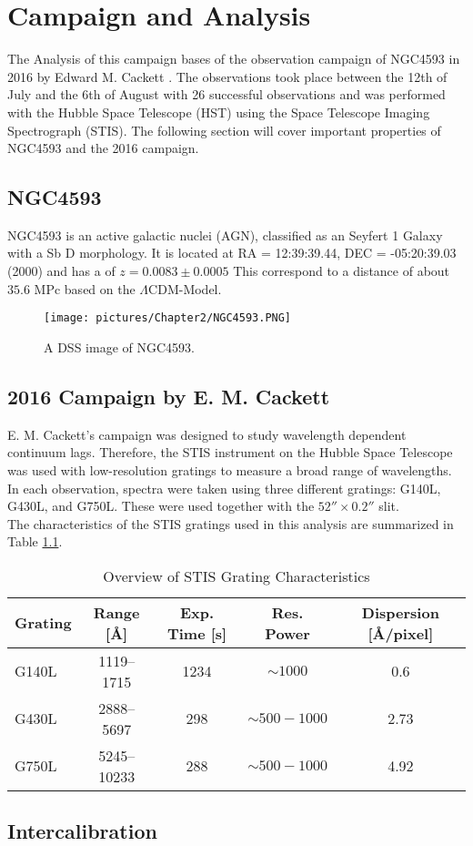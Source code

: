 \chapter{Campaign and Analysis}
\label{campaign_and_analysis}
The Analysis of this campaign bases of the observation campaign of NGC4593 in 2016 by Edward M. Cackett \parencite{cackett2018accretion}. The observations took place between the 12th of July and the 6th of August with 26 successful observations and was performed with the Hubble Space Telescope (HST) using the Space Telescope Imaging Spectrograph (STIS). The following section will cover important properties of NGC4593 and the 2016 campaign.

\section{NGC4593}
\label{NGC4593}

NGC4593 is an active galactic nuclei (AGN), classified as an Seyfert 1 Galaxy with a Sb D morphology.  It is located at RA = 12:39:39.44, DEC = -05:20:39.03 (2000) and has a of $ z = 0.0083 \pm 0.0005$ This correspond to a distance of about $35.6$ MPc \parencite{simbaNGC4593}based on the $\Lambda$CDM-Model. 

\begin{figure}[!ht]
	\centering
	\texttt{[image: pictures/Chapter2/NGC4593.PNG]}
	\caption{A DSS image of NGC4593.}
	\label{fig:NGC4593}
\end{figure}

\section{2016 Campaign by E. M. Cackett}
\label{Campaign_Cackett}

E. M. Cackett's campaign was designed to study wavelength dependent continuum lags. Therefore, the STIS instrument on the Hubble Space Telescope was used with low-resolution gratings to measure a broad range of wavelengths. In each observation, spectra were taken using three different gratings: G140L, G430L, and G750L. These were used together with the $52'' \times 0.2''$ slit.\\
The characteristics of the STIS gratings used in this analysis are summarized in Table \ref{tab:stis_gratings}.

\begin{table}[h!]
	\centering
	\small
	\caption{Overview of STIS Grating Characteristics \parencite{stisgratings}}
	\label{tab:stis_gratings}
	\begin{tabular}{lcccc}
		\hline
		\textbf{Grating} & \textbf{Range [\AA]} & \textbf{Exp. Time [s]} & \textbf{Res. Power} & \textbf{Dispersion [\AA/pixel]} \\
		\hline
		G140L  & 1119--1715  & 1234 & $\sim 1000$         & 0.6 \\
		G430L  & 2888--5697  & 298  & $\sim 500 - 1000$    & 2.73 \\
		G750L  & 5245--10233 & 288  & $\sim 500 - 1000$    & 4.92 \\
		\hline
	\end{tabular}
\end{table}

\section{Intercalibration}
